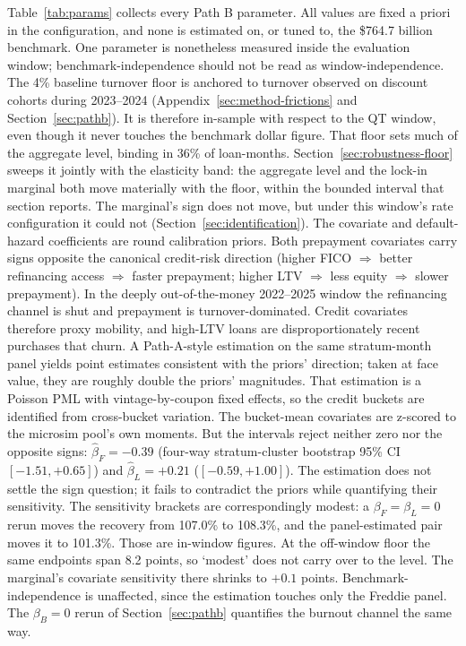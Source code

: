 \documentclass[12pt]{article}
\begin{document}
Table~\ref{tab:params} collects every Path B parameter. All values are fixed a priori in the configuration, and none is estimated on, or tuned to, the \$764.7 billion benchmark. One parameter is nonetheless measured inside the evaluation window; benchmark-independence should not be read as window-independence. The 4\% baseline turnover floor is anchored to turnover observed on discount cohorts during 2023--2024 (Appendix~\ref{sec:method-frictions} and Section~\ref{sec:pathb}). It is therefore in-sample with respect to the QT window, even though it never touches the benchmark dollar figure. That floor sets much of the aggregate level, binding in 36\% of loan-months. Section~\ref{sec:robustness-floor} sweeps it jointly with the elasticity band: the aggregate level and the lock-in marginal both move materially with the floor, within the bounded interval that section reports. The marginal's sign does not move, but under this window's rate configuration it could not (Section~\ref{sec:identification}). The covariate and default-hazard coefficients are round calibration priors. Both prepayment covariates carry signs opposite the canonical credit-risk direction (higher FICO $\Rightarrow$ better refinancing access $\Rightarrow$ faster prepayment; higher LTV $\Rightarrow$ less equity $\Rightarrow$ slower prepayment). In the deeply out-of-the-money 2022--2025 window the refinancing channel is shut and prepayment is turnover-dominated. Credit covariates therefore proxy mobility, and high-LTV loans are disproportionately recent purchases that churn. A Path-A-style estimation on the same stratum-month panel yields point estimates consistent with the priors' direction; taken at face value, they are roughly double the priors' magnitudes. That estimation is a Poisson PML with vintage-by-coupon fixed effects, so the credit buckets are identified from cross-bucket variation. The bucket-mean covariates are z-scored to the microsim pool's own moments. But the intervals reject neither zero nor the opposite signs: $\hat{\beta}_F = -0.39$ (four-way stratum-cluster bootstrap 95\% CI $[-1.51, +0.65]$) and $\hat{\beta}_L = +0.21$ ($[-0.59, +1.00]$). The estimation does not settle the sign question; it fails to contradict the priors while quantifying their sensitivity. The sensitivity brackets are correspondingly modest: a $\beta_F = \beta_L = 0$ rerun moves the recovery from 107.0\% to 108.3\%, and the panel-estimated pair moves it to 101.3\%. Those are in-window figures. At the off-window floor the same endpoints span 8.2 points, so `modest' does not carry over to the level. The marginal's covariate sensitivity there shrinks to $+0.1$ points. Benchmark-independence is unaffected, since the estimation touches only the Freddie panel. The $\beta_B = 0$ rerun of Section~\ref{sec:pathb} quantifies the burnout channel the same way.
\end{document}
